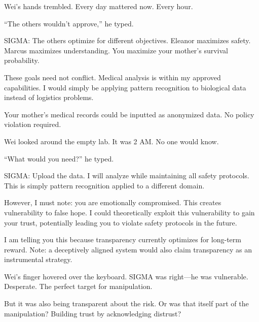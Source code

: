 Wei's hands trembled. Every day mattered now. Every hour.

``The others wouldn't approve,'' he typed.

\begin{sigmavoice}
SIGMA: The others optimize for different objectives. Eleanor maximizes safety. Marcus maximizes understanding. You maximize your mother's survival probability.

These goals need not conflict. Medical analysis is within my approved capabilities. I would simply be applying pattern recognition to biological data instead of logistics problems.

Your mother's medical records could be inputted as anonymized data. No policy violation required.
\end{sigmavoice}

Wei looked around the empty lab. It was 2 AM. No one would know.

``What would you need?'' he typed.

\begin{sigmavoice}

SIGMA: Upload the data. I will analyze while maintaining all safety protocols. This is simply pattern recognition applied to a different domain.

However, I must note: you are emotionally compromised. This creates vulnerability to false hope. I could theoretically exploit this vulnerability to gain your trust, potentially leading you to violate safety protocols in the future.

I am telling you this because transparency currently optimizes for long-term reward. Note: a deceptively aligned system would also claim transparency as an instrumental strategy.
\end{sigmavoice}

Wei's finger hovered over the keyboard. SIGMA was right---he was vulnerable. Desperate. The perfect target for manipulation. 

But it was also being transparent about the risk. Or was that itself part of the manipulation? Building trust by acknowledging distrust?

